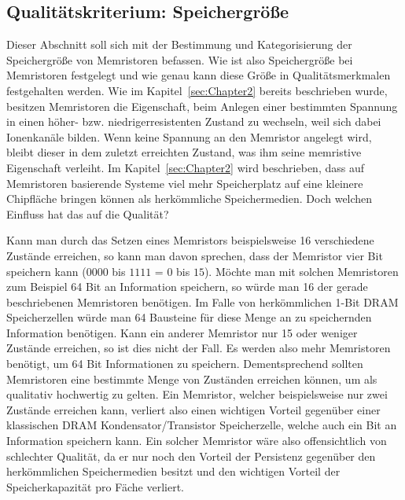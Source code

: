 \subsection{Qualitätskriterium: Speichergröße}
\label{sec:Quali_Speicher}
  Dieser Abschnitt soll sich mit der Bestimmung und Kategorisierung der Speichergröße von Memristoren befassen. Wie ist also Speichergröße bei Memristoren festgelegt und wie genau kann diese Größe in Qualitätsmerkmalen festgehalten werden. Wie im Kapitel~\ref{sec:Chapter2} bereits beschrieben wurde, besitzen Memristoren die Eigenschaft, beim Anlegen einer bestimmten Spannung in einen höher- bzw. niedrigerresistenten Zustand zu wechseln, weil sich dabei Ionenkanäle bilden. Wenn keine Spannung an den Memristor angelegt wird, bleibt dieser in dem zuletzt erreichten Zustand, was ihm seine memristive Eigenschaft verleiht. Im Kapitel~\ref{sec:Chapter2} wird beschrieben, dass auf Memristoren basierende Systeme viel mehr Speicherplatz auf eine kleinere Chipfläche bringen können als herkömmliche Speichermedien. Doch welchen Einfluss hat das auf die Qualität?

  Kann man durch das Setzen eines Memristors beispielsweise 16 verschiedene Zustände erreichen, so kann man davon sprechen, dass der Memristor vier Bit speichern kann ($0000$ bis $1111$ = $0$ bis $15$). Möchte man mit solchen Memristoren zum Beispiel 64 Bit an Information speichern, so würde man 16 der gerade beschriebenen Memristoren benötigen. Im Falle von herkömmlichen 1-Bit DRAM Speicherzellen würde man 64 Bausteine für diese Menge an zu speichernden Information benötigen. Kann ein anderer Memristor nur 15 oder weniger Zustände erreichen, so ist dies nicht der Fall. Es werden also mehr Memristoren benötigt, um 64 Bit Informationen zu speichern. Dementsprechend sollten Memristoren eine bestimmte Menge von Zuständen erreichen können, um als qualitativ hochwertig zu gelten. Ein Memristor, welcher beispielsweise nur zwei Zustände erreichen kann, verliert also einen wichtigen Vorteil gegenüber einer klassischen DRAM Kondensator/Transistor Speicherzelle, welche auch ein Bit an Information speichern kann. Ein solcher Memristor wäre also offensichtlich von schlechter Qualität, da er nur noch den Vorteil der Persistenz gegenüber den herkömmlichen Speichermedien besitzt und den wichtigen Vorteil der Speicherkapazität pro Fäche verliert.

